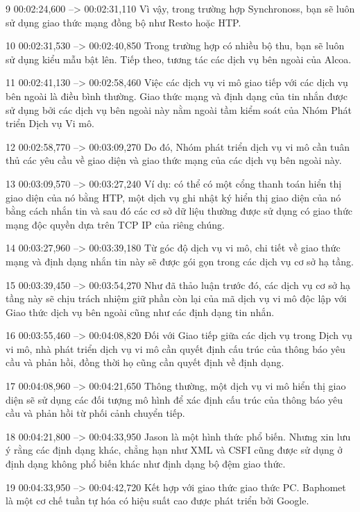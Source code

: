 9
00:02:24,600 --> 00:02:31,110
Vì vậy, trong trường hợp Synchronoss, bạn sẽ luôn sử dụng giao thức mạng đồng bộ như Resto hoặc HTP.

10
00:02:31,530 --> 00:02:40,850
Trong trường hợp có nhiều bộ thu, bạn sẽ luôn sử dụng kiểu mẫu bật lên.  Tiếp theo, tương tác các dịch vụ bên ngoài của Alcoa.

11
00:02:41,130 --> 00:02:58,460
Việc các dịch vụ vi mô giao tiếp với các dịch vụ bên ngoài là điều bình thường.  Giao thức mạng và định dạng của tin nhắn được sử dụng bởi các dịch vụ bên ngoài này nằm ngoài tầm kiểm soát của Nhóm Phát triển Dịch vụ Vi mô.

12
00:02:58,770 --> 00:03:09,270
Do đó, Nhóm phát triển dịch vụ vi mô cần tuân thủ các yêu cầu về giao diện và giao thức mạng của các dịch vụ bên ngoài này.

13
00:03:09,570 --> 00:03:27,240
Ví dụ: có thể có một cổng thanh toán hiển thị giao diện của nó bằng HTP, một dịch vụ ghi nhật ký hiển thị giao diện của nó bằng cách nhắn tin và sau đó các cơ sở dữ liệu thường được sử dụng có giao thức mạng độc quyền dựa trên TCP IP của riêng chúng.

14
00:03:27,960 --> 00:03:39,180
Từ góc độ dịch vụ vi mô, chi tiết về giao thức mạng và định dạng nhắn tin này sẽ được gói gọn trong các dịch vụ cơ sở hạ tầng.

15
00:03:39,450 --> 00:03:54,270
Như đã thảo luận trước đó, các dịch vụ cơ sở hạ tầng này sẽ chịu trách nhiệm giữ phần còn lại của mã dịch vụ vi mô độc lập với Giao thức dịch vụ bên ngoài cũng như các định dạng tin nhắn.

16
00:03:55,460 --> 00:04:08,820
Đối với Giao tiếp giữa các dịch vụ trong Dịch vụ vi mô, nhà phát triển dịch vụ vi mô cần quyết định cấu trúc của thông báo yêu cầu và phản hồi, đồng thời họ cũng cần quyết định về định dạng.

17
00:04:08,960 --> 00:04:21,650
Thông thường, một dịch vụ vi mô hiển thị giao diện sẽ sử dụng các đối tượng mô hình để xác định cấu trúc của thông báo yêu cầu và phản hồi từ phối cảnh chuyển tiếp.

18
00:04:21,800 --> 00:04:33,950
Jason là một hình thức phổ biến.  Nhưng xin lưu ý rằng các định dạng khác, chẳng hạn như XML và CSFI cũng được sử dụng ở định dạng không phổ biến khác như định dạng bộ đệm giao thức.

19
00:04:33,950 --> 00:04:42,720
Kết hợp với giao thức giao thức PC.  Baphomet là một cơ chế tuần tự hóa có hiệu suất cao được phát triển bởi Google.

